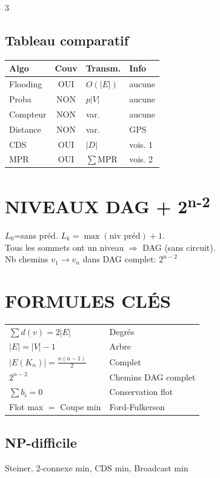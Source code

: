 \documentclass[a4paper,4pt]{article}
\begin{document}
\begin{multicols}{3}
\subsection{Tableau comparatif}
\begin{tabular}{@{}l|c|l|l@{}}
Algo & Couv & Transm. & Info\\
\hline
Flooding & OUI & $O(|E|)$ & aucune\\
Proba & NON & $p|V|$ & aucune\\
Compteur & NON & var. & aucune\\
Distance & NON & var. & GPS\\
CDS & OUI & $|D|$ & vois. 1\\
MPR & OUI & $\sum$MPR & vois. 2\\
\end{tabular}

\section{NIVEAUX DAG + 2\textsuperscript{n-2}}

$L_0$=sans pr\'ed. $L_k=\max(\text{niv pr\'ed})+1$.\\
Tous les sommets ont un niveau $\Rightarrow$ DAG (sans circuit).\\
Nb chemins $v_1\to v_n$ dans DAG complet: {\color{red}$2^{n-2}$}

\section{FORMULES CL\'ES}

\begin{tabular}{@{}l|l@{}}
$\sum d(v)=2|E|$ & Degr\'es\\
$|E|=|V|-1$ & Arbre\\
$|E(K_n)|=\frac{n(n-1)}{2}$ & Complet\\
$2^{n-2}$ & Chemins DAG complet\\
$\sum b_i=0$ & Conservation flot\\
Flot max $=$ Coupe min & Ford-Fulkerson\\
\end{tabular}

\subsection{NP-difficile}
Steiner, 2-connexe min, CDS min, Broadcast min


\end{multicols}
\end{document}

